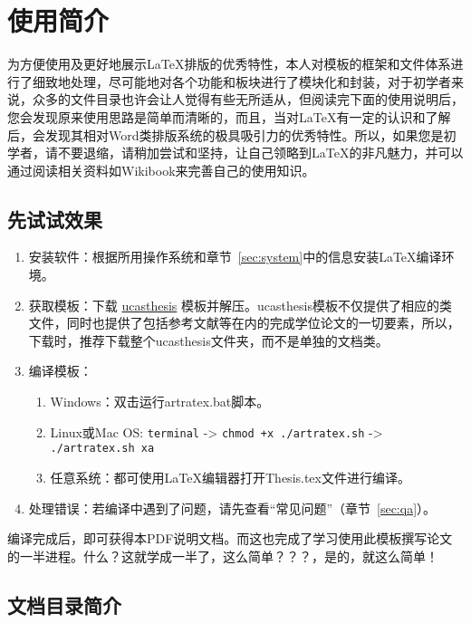 
\chapter{使用简介}
\label{chap:guide}

为方便使用及更好地展示\LaTeX{}排版的优秀特性，本人对模板的框架和文件体系进行了细致地处理，尽可能地对各个功能和板块进行了模块化和封装，对于初学者来说，众多的文件目录也许会让人觉得有些无所适从，但阅读完下面的使用说明后，您会发现原来使用思路是简单而清晰的，而且，当对\LaTeX{}有一定的认识和了解后，会发现其相对Word类排版系统的极具吸引力的优秀特性。所以，如果您是初学者，请不要退缩，请稍加尝试和坚持，让自己领略到\LaTeX{}的非凡魅力，并可以通过阅读相关资料如Wikibook\citep{wikibook2014latex}来完善自己的使用知识。

\section{先试试效果}

\begin{enumerate}
    \item 安装软件：根据所用操作系统和章节~\ref{sec:system}中的信息安装\LaTeX{}编译环境。
    \item 获取模板：下载 \href{https://github.com/mohuangrui/ucasthesis}{ucasthesis} 模板并解压。ucasthesis模板不仅提供了相应的类文件，同时也提供了包括参考文献等在内的完成学位论文的一切要素，所以，下载时，推荐下载整个ucasthesis文件夹，而不是单独的文档类。
    \item 编译模板：
        \begin{enumerate}
            \item Windows：双击运行artratex.bat脚本。
            \item Linux或Mac OS: {\scriptsize \verb|terminal| -> \verb|chmod +x ./artratex.sh| -> \verb|./artratex.sh xa|}
            \item 任意系统：都可使用\LaTeX{}编辑器打开Thesis.tex文件进行编译。
        \end{enumerate}
    \item 处理错误：若编译中遇到了问题，请先查看“常见问题”（章节~\ref{sec:qa}）。
\end{enumerate}

编译完成后，即可获得本PDF说明文档。而这也完成了学习使用此模板撰写论文的一半进程。什么？这就学成一半了，这么简单？？？，是的，就这么简单！

\section{文档目录简介}

